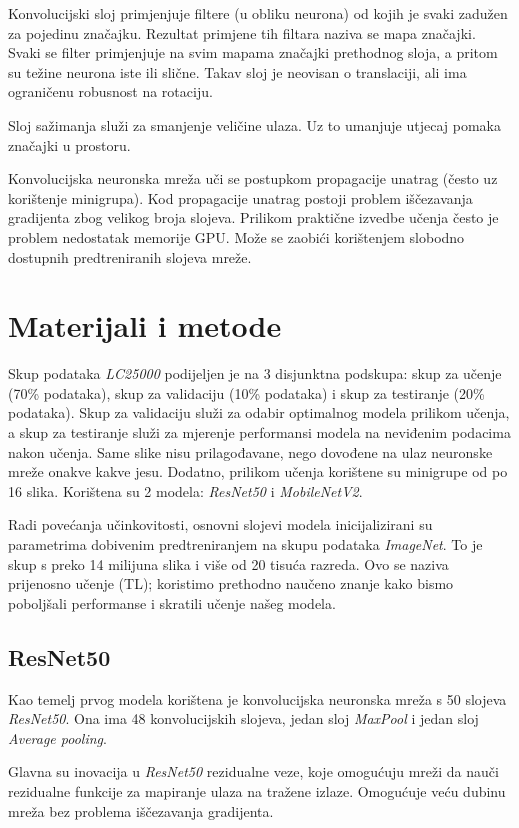 \documentclass[conference, utf8]{IEEEtran}
\begin{document}
	Konvolucijski sloj primjenjuje filtere (u obliku neurona) od kojih je svaki zadužen za pojedinu značajku. Rezultat primjene tih filtara naziva se mapa značajki. Svaki se filter primjenjuje na svim mapama značajki prethodnog sloja, a pritom su težine neurona iste ili slične. Takav sloj je neovisan o translaciji, ali ima ograničenu robusnost na rotaciju. 
	
	Sloj sažimanja služi za smanjenje veličine ulaza. Uz to umanjuje utjecaj pomaka značajki u prostoru.
	
	Konvolucijska neuronska mreža uči se postupkom propagacije unatrag (često uz korištenje minigrupa). Kod propagacije unatrag postoji problem iščezavanja gradijenta zbog velikog broja slojeva. Prilikom praktične izvedbe učenja često je problem nedostatak memorije GPU. Može se zaobići korištenjem slobodno dostupnih predtreniranih slojeva mreže.
	
	\section{Materijali i metode}
	Skup podataka \textit{LC25000} podijeljen je na 3 disjunktna podskupa: skup za učenje (70\% podataka), skup za validaciju (10\% podataka) i skup za testiranje (20\% podataka). Skup za validaciju služi za odabir optimalnog modela prilikom učenja, a skup za testiranje služi za mjerenje performansi modela na neviđenim podacima nakon učenja. Same slike nisu prilagođavane, nego dovođene na ulaz neuronske mreže onakve kakve jesu. Dodatno, prilikom učenja korištene su minigrupe od po 16 slika. Korištena su 2 modela: \textit{ResNet50} i \textit{MobileNetV2}. 
	
	Radi povećanja učinkovitosti, osnovni slojevi modela inicijalizirani su parametrima dobivenim predtreniranjem na skupu podataka \textit{ImageNet}. To je skup s preko 14 milijuna slika i više od 20 tisuća razreda. Ovo se naziva prijenosno učenje (TL); koristimo prethodno naučeno znanje kako bismo poboljšali performanse i skratili učenje našeg modela.
	
	\subsection{ResNet50}
	Kao temelj prvog modela korištena je konvolucijska neuronska mreža s 50 slojeva \textit{ResNet50}. Ona ima 48 konvolucijskih slojeva, jedan sloj \textit{MaxPool} i jedan sloj \textit{Average pooling}. 
	
	Glavna su inovacija u \textit{ResNet50} rezidualne veze, koje omogućuju mreži da nauči rezidualne funkcije za mapiranje ulaza na tražene izlaze. Omogućuje veću dubinu mreža bez problema iščezavanja gradijenta. 
	
\end{document}
